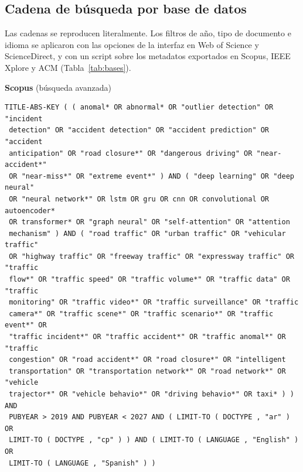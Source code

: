 \documentclass[12pt, a4paper]{article}
\begin{document}
\subsection*{Cadena de b\'{u}squeda por base de datos}

Las cadenas se reproducen literalmente. Los filtros de a\~{n}o, tipo de documento e idioma se aplicaron con las opciones de la interfaz en Web of Science y ScienceDirect, y con un script sobre los metadatos exportados en Scopus, IEEE Xplore y ACM (Tabla~\ref{tab:bases}).

{\footnotesize
\noindent\textbf{Scopus} (b\'{u}squeda avanzada)
\begin{verbatim}
TITLE-ABS-KEY ( ( anomal* OR abnormal* OR "outlier detection" OR "incident
 detection" OR "accident detection" OR "accident prediction" OR "accident
 anticipation" OR "road closure*" OR "dangerous driving" OR "near-accident*"
 OR "near-miss*" OR "extreme event*" ) AND ( "deep learning" OR "deep neural"
 OR "neural network*" OR lstm OR gru OR cnn OR convolutional OR autoencoder*
 OR transformer* OR "graph neural" OR "self-attention" OR "attention
 mechanism" ) AND ( "road traffic" OR "urban traffic" OR "vehicular traffic"
 OR "highway traffic" OR "freeway traffic" OR "expressway traffic" OR "traffic
 flow*" OR "traffic speed" OR "traffic volume*" OR "traffic data" OR "traffic
 monitoring" OR "traffic video*" OR "traffic surveillance" OR "traffic
 camera*" OR "traffic scene*" OR "traffic scenario*" OR "traffic event*" OR
 "traffic incident*" OR "traffic accident*" OR "traffic anomal*" OR "traffic
 congestion" OR "road accident*" OR "road closure*" OR "intelligent
 transportation" OR "transportation network*" OR "road network*" OR "vehicle
 trajector*" OR "vehicle behavio*" OR "driving behavio*" OR taxi* ) ) AND
 PUBYEAR > 2019 AND PUBYEAR < 2027 AND ( LIMIT-TO ( DOCTYPE , "ar" ) OR
 LIMIT-TO ( DOCTYPE , "cp" ) ) AND ( LIMIT-TO ( LANGUAGE , "English" ) OR
 LIMIT-TO ( LANGUAGE , "Spanish" ) )
\end{verbatim}

}
\end{document}
